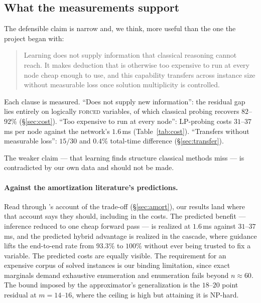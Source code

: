 \documentclass[12pt]{article}
\begin{document}
\subsection{What the measurements support}

The defensible claim is narrow and, we think, more useful than the one the project began with:

\begin{quote}
Learning does not supply information that classical reasoning cannot reach. It makes deduction that is otherwise too expensive to run at every node cheap enough to use, and this capability transfers across instance size without measurable loss once solution multiplicity is controlled.
\end{quote}

Each clause is measured. ``Does not supply new information'': the residual gap lies entirely on logically \textsc{forced} variables, of which classical probing recovers $82$--$92\%$ (\S\ref{sec:cost}). ``Too expensive to run at every node'': LP-probing costs $31$--$37$\,ms per node against the network's $1.6$\,ms (Table~\ref{tab:cost}). ``Transfers without measurable loss'': $15/30$ and $0.4\%$ total-time difference (\S\ref{sec:transfer}).

The weaker claim --- that learning finds structure classical methods miss --- is contradicted by our own data and should not be made.

\paragraph{Against the amortization literature's predictions.} Read through \citet{millidge2022deconfusing}'s account of the trade-off (\S\ref{sec:amort}), our results land where that account says they should, including in the costs. The predicted benefit --- inference reduced to one cheap forward pass --- is realized at $1.6$\,ms against $31$--$37$\,ms, and the predicted hybrid advantage is realized in the cascade, where guidance lifts the end-to-end rate from $93.3\%$ to $100\%$ without ever being trusted to fix a variable. The predicted costs are equally visible. The requirement for an expensive corpus of solved instances is our binding limitation, since exact marginals demand exhaustive enumeration and enumeration fails beyond $n\approx60$. The bound imposed by the approximator's generalization is the $18$--$20$ point residual at $m=14$--$16$, where the ceiling is high but attaining it is NP-hard.
\end{document}
